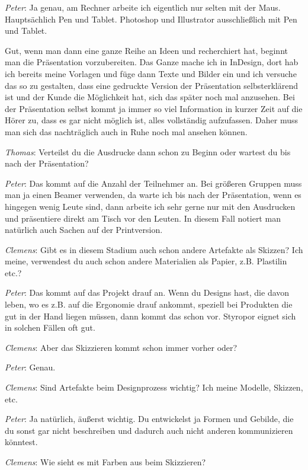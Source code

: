 \medskip \emph{Peter}: Ja genau, am Rechner arbeite ich eigentlich nur selten mit der Maus. Hauptsächlich Pen und Tablet. Photoshop und Illustrator ausschließlich mit Pen und Tablet.

Gut, wenn man dann eine ganze Reihe an Ideen und recherchiert hat, beginnt man die Präsentation vorzubereiten. Das Ganze mache ich in InDesign, dort hab ich bereits meine Vorlagen und füge dann Texte und Bilder ein und ich versuche das so zu gestalten, dass eine gedruckte Version der Präsentation selbsterklärend ist und der Kunde die Möglichkeit hat, sich das später noch mal anzusehen. Bei der Präsentation selbst kommt ja immer so viel Information in kurzer Zeit auf die Hörer zu, dass es gar nicht möglich ist, alles vollständig aufzufassen. Daher muss man sich das nachträglich auch in Ruhe noch mal ansehen können.

\medskip \emph{Thomas}: Verteilst du die Ausdrucke dann schon zu Beginn oder wartest du bis nach der Präsentation?

\medskip \emph{Peter}: Das kommt auf die Anzahl der Teilnehmer an. Bei größeren Gruppen muss man ja einen Beamer verwenden, da warte ich bis nach der Präsentation, wenn es hingegen wenig Leute sind, dann arbeite ich sehr gerne nur mit den Ausdrucken und präsentiere direkt am Tisch vor den Leuten. In diesem Fall notiert man natürlich auch Sachen auf der Printversion. 

\medskip \emph{Clemens}: Gibt es in diesem Stadium auch schon andere Artefakte als Skizzen? Ich meine, verwendest du auch schon andere Materialien als Papier, z.B. Plastilin etc.?

\medskip \emph{Peter}: Das kommt auf das Projekt drauf an. Wenn du Designs hast, die davon leben, wo es z.B. auf die Ergonomie drauf ankommt, speziell bei Produkten die gut in der Hand liegen müssen, dann kommt das schon vor. Styropor eignet sich in solchen Fällen oft gut.

\medskip \emph{Clemens}: Aber das Skizzieren kommt schon immer vorher oder?

\medskip \emph{Peter}: Genau.

\medskip \emph{Clemens}: Sind Artefakte beim Designprozess wichtig? Ich meine Modelle, Skizzen, etc.

\medskip \emph{Peter}: Ja natürlich, äußerst wichtig. Du entwickelst ja Formen und Gebilde, die du sonst gar nicht beschreiben und dadurch auch nicht anderen kommunizieren könntest.

\medskip \emph{Clemens}: Wie sieht es mit Farben aus beim Skizzieren?

